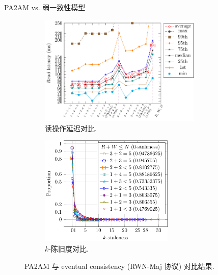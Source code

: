 \begin{frame}{PA2AM vs. 弱一致性模型}
  \begin{figure}
	\begin{subfigure}{0.50\textwidth}
	  \centering
	  \includegraphics[width = 0.85\textwidth]{figures/rwn-2am-read-latency-quantiles.pdf}
	  \caption{读操作延迟对比.}
	\end{subfigure}%
	\begin{subfigure}{0.50\textwidth}
	  \centering
	  \includegraphics[width = 0.70\textwidth]{figures/rwn-maj.pdf}
	  \caption{$k$-陈旧度对比.}
	\end{subfigure}
	\caption{PA2AM 与 eventual consistency (RWN-Maj 协议) 对比结果.}
  \end{figure}

  \vspace{-0.50cm}
  
\end{frame}
